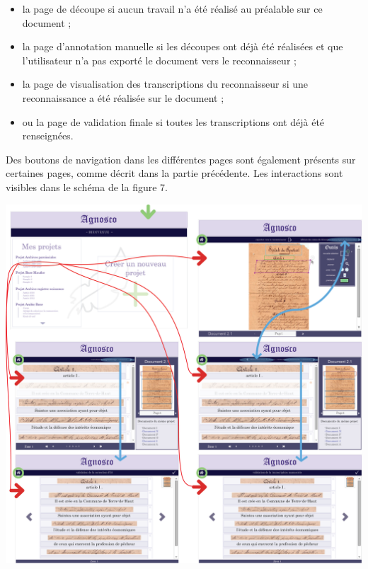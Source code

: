 \begin{itemize}
\item la page de découpe si aucun travail n’a été réalisé au préalable sur ce document ;
\item la page d’annotation manuelle si les découpes ont déjà été réalisées et que l’utilisateur n’a pas exporté le document vers le reconnaisseur ;
\item la page de visualisation des transcriptions du reconnaisseur si une reconnaissance a été réalisée sur le document ;
\item ou la page de validation finale si toutes les transcriptions ont déjà été renseignées.
\end{itemize}

Des boutons de navigation dans les différentes pages sont également présents sur certaines pages, comme décrit dans la partie précédente. Les interactions sont visibles dans le schéma de la figure 7.

\begin{mdframed}[frametitle={Figure 7 : Schéma des interactions entre les différents composants de l'IHM}, innerbottommargin=10]
\begin{center}
\includegraphics[scale=0.5]{assets/schemaIHMinteractions.png}
\end{center}
\end{mdframed}